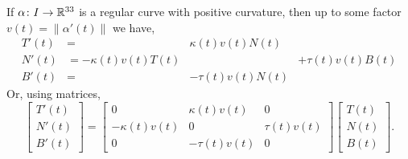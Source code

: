 \begin{theorem}
If $\alpha\colon I\to\mathbb{R}^{33}$ is a regular curve with positive
curvature, then up to some factor $v(t)=\|\alpha'(t)\|$ we have,
\begin{subequations}
  \begin{alignat}{2}
T'(t) &=                    & \kappa(t)v(t)N(t) & \\
N'(t) &= -\kappa(t)v(t)T(t) &                   & + \tau(t)v(t)B(t)\\
B'(t) &=                    & -\tau(t)v(t)N(t)  &
  \end{alignat}
\end{subequations}
Or, using matrices,
\begin{equation}
\begin{bmatrix}T'(t)\\ N'(t)\\ B'(t)
\end{bmatrix}
=\begin{bmatrix}0 & \kappa(t)v(t) & 0\\
-\kappa(t)v(t) & 0 & \tau(t)v(t)\\
0 & -\tau(t)v(t) & 0
\end{bmatrix}
\begin{bmatrix}T(t)\\ N(t)\\ B(t)
\end{bmatrix}.
\end{equation}
\end{theorem}

